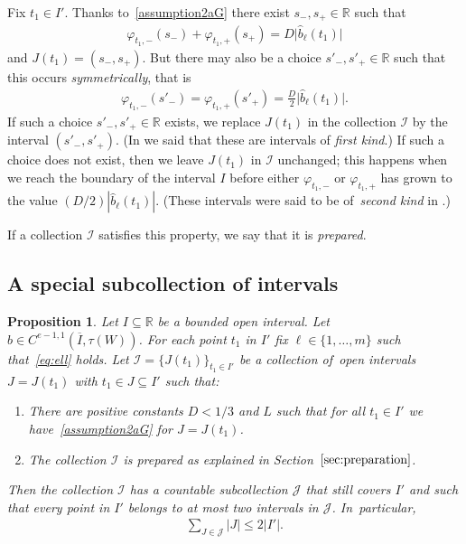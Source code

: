 \documentclass[pdftex]{sigma}
\numberwithin{equation}{section}
\newtheorem{Proposition}[Theorem]{Proposition}
 { \theoremstyle{definition}
\newtheorem{Definition}[Theorem]{Definition}
\newtheorem{Note}[Theorem]{Note}
\newtheorem{Example}[Theorem]{Example}
\newtheorem{Remark}[Theorem]{Remark}
\newtheorem{Question}[Theorem]{Question} }
\def\ta{\tau}
\def\vh{\varphi}
\def\R{\mathbb{R}}
\def\cI{\mathcal{I}}
\def\cJ{\mathcal{J}}
\def\we{\hat}
\begin{document}
Fix $t_1 \in I'$. Thanks to~\eqref{assumption2aG} there exist $s_-,s_+ \in \R$ such that
\begin{gather*}
\vh_{t_1,-}(s_-) + \vh_{t_1,+}(s_+) = D \big|\we b_\ell(t_1)\big|
\end{gather*}
and $J(t_1) = (s_-,s_+)$.
But there may also be a choice $s'_-,s'_+ \in \R$ such that this occurs \emph{symmetrically}, that is
\begin{gather*} %
 \vh_{t_1,-}(s'_-) = \vh_{t_1,+}(s'_+) = \frac D 2\big|\we b_\ell(t_1)\big|.
 \end{gather*}
If such a choice $s'_-,s'_+ \in \R$ exists, we replace $J(t_1)$ in the collection $\cI$ by the interval $(s'_-,s'_+)$.
(In \cite{ParusinskiRainer15} we said that these are intervals of \emph{first kind}.)
If such a choice does not exist, then we leave $J(t_1)$ in $\cI$ unchanged;
this happens when
we reach the boundary of the interval $I$ before either $\vh_{t_1,-}$ or $\vh_{t_1,+}$ has
 grown to the value $(D/2)|\we b_\ell(t_1)|$. (These intervals were said to be of~\emph{second kind} in \cite{ParusinskiRainer15}.)

If a collection $\cI$ satisfies this property, we say that it is \emph{prepared}.



\subsection{A special subcollection of intervals}


\begin{Proposition} \label{cover}
 Let $I \subseteq \R$ be a bounded open interval.
 Let $b \in C^{e-1,1}(\overline I,\ta(W))$.
 For each point $t_1$ in $I'$ fix $\ell \in \{1, \dots, m\}$ such that~\eqref{eq:ell} holds.
 Let $\cI=\{J(t_1)\}_{t_1\in I'}$ be a collection of~open intervals $J=J(t_1)$ with $t_1 \in J \subseteq I'$ such that:
\begin{enumerate}\itemsep=0pt
 \item[$1.$] There are positive constants $D < 1/3$ and $L$ such that
 for all $t_1 \in I'$ we have~\eqref{assumption2aG} for $J=J(t_1)$.
 \item[$2.$] The collection $\cI$ is prepared as explained in Section~$\ref{sec:preparation}$.
 \end{enumerate}
Then the collection $\cI$ has a countable subcollection $\cJ$ that still
 covers $I'$ and such that every point in $I'$ belongs to at most two intervals in $\cJ$. In~particular,
 \begin{gather*}
 \sum_{J \in \cJ} |J| \le 2 |I'|.
 \end{gather*}
\end{Proposition}
\end{document}
